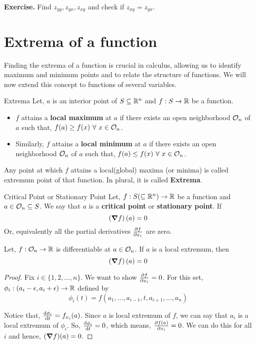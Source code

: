 \documentclass[../Analysis-3.tex]{subfiles}
\begin{document}
\textbf{Exercise.} Find $z_{yy}, z_{yx}, z_{xy}$ and check if $z_{xy} = z_{yx}$.

\section{Extrema of a function}

Finding the extrema of a function is crucial in calculus, allowing us to identify maximum and minimum points and to relate the structure of functions. We will now extend this concept to functions of several variables.

\begin{Def}{Extrema}{}
  Let, $a$ is an interior point of $S \subseteq \mathbb{R}^n$ and $f : S \to \mathbb{R}$ be a function.

  \begin{itemize}
    \item $f$ attains a \textbf{local maximum} at $a$ if there exists an open neighborhood $\mathcal{O}_{n}$ of $a$ such that, $f(a) \geq f(x)\ \forall\ x \in \mathcal{O}_{n}$.
    \item Similarly, $f$ attains a \textbf{local minimum} at $a$ if there exists an open neighborhood $\mathcal{O}_{n}$ of $a$ such that, $f(a) \leq f(x)\ \forall\ x \in \mathcal{O}_{n}$.
  \end{itemize}

  Any point at which $f$ attains a local(global) maxima (or minima)  is called extremum point of that function. In plural, it is called \textbf{Extrema}.
\end{Def}

\begin{Def}{Critical Point or Stationary Point}{}
  Let, $f : S (\subseteq \mathbb{R}^n) \to \mathbb{R}$ be a function and $a \in \mathcal{O}_{n} \subseteq S$. We say that $a$ is a \textbf{critical point} or \textbf{stationary point}.
  If \[ \left(\grad f\right)(a) = 0\]
  Or, equivalently all the partial derivatives $\pdv{f}{x_i}$ are zero.
\end{Def}

\begin{Thm}{}{}
  Let, $f: \mathcal{O}_{n} \to \mathbb{R}$ is differentiable at $a \in \mathcal{O}_{n}$. If $a$ is a local extremum, then \[ \left(\grad f\right)(a) = 0 \]
\end{Thm}

\begin{proof}
  Fix $i \in \{1,2, \ldots, n\}$. We want to show $\pdv{f}{x_i} = 0$. For this set, $\phi_i : (a_i - \epsilon, a_i + \epsilon) \to \mathbb{R}$ defined by $$ \phi_i(t) = f(a_1, \ldots, a_{i-1}, t, a_{i+1}, \ldots, a_n)$$

  Notice that, $\dv{\phi_i}{t}(a_i) = f_{x_i}(a)$. Since $a$ is local extremum of $f$, we can say that $a_i$ is a local extremum of $\phi_i$. So, $\dv{\phi_i}{t}(a_i) = 0$, which means, $\pdv{f(a)}{x_i} = 0$. We can do this for all $i$ and hence, $(\grad f)(a) = 0$.
\end{proof}
\end{document}
